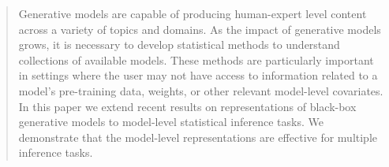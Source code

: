 
\begin{abstract}
Generative models are capable of producing human-expert level content across a variety of topics and domains.
As the impact of generative models grows, it is necessary to develop statistical methods to understand collections of available models.
These methods are particularly important in settings where the user may not have access to information related to a model's pre-training data, weights, or other relevant model-level covariates.
In this paper we extend recent results on representations of black-box generative models to model-level statistical inference tasks.  
We demonstrate that the model-level representations are effective for multiple inference tasks.
\end{abstract}